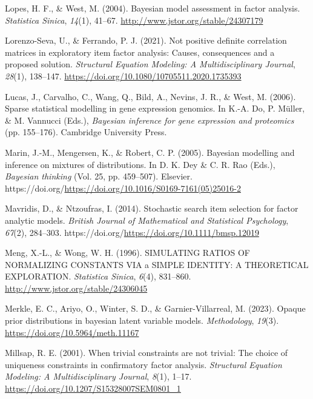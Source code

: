 \documentclass[
  man,
  longtable,
  nolmodern,
  notxfonts,
  notimes,
  colorlinks=true,linkcolor=blue,citecolor=blue,urlcolor=blue]{apa7}
\newlength{\cslhangindent}
\newenvironment{CSLReferences}[2] %
 {\begin{list}{}{%
  \setlength{\itemindent}{0pt}
  \setlength{\leftmargin}{0pt}
  \setlength{\parsep}{0pt}
  \ifodd #1
   \setlength{\leftmargin}{\cslhangindent}
   \setlength{\itemindent}{-1\cslhangindent}
  \fi
  \setlength{\itemsep}{#2\baselineskip}}}
 {\end{list}}
\theoremstyle{plain}
\theoremstyle{plain}
\theoremstyle{remark}
\begin{document}
\begin{CSLReferences}{1}{0}
Lopes, H. F., \& West, M. (2004). Bayesian model assessment in factor
analysis. \emph{Statistica Sinica}, \emph{14}(1), 41--67.
\url{http://www.jstor.org/stable/24307179}

Lorenzo-Seva, U., \& Ferrando, P. J. (2021). Not positive definite
correlation matrices in exploratory item factor analysis: Causes,
consequences and a proposed solution. \emph{Structural Equation
Modeling: A Multidisciplinary Journal}, \emph{28}(1), 138--147.
\url{https://doi.org/10.1080/10705511.2020.1735393}

Lucas, J., Carvalho, C., Wang, Q., Bild, A., Nevins, J. R., \& West, M.
(2006). Sparse statistical modelling in gene expression genomics. In
K.-A. Do, P. Müller, \& M. Vannucci (Eds.), \emph{Bayesian inference for
gene expression and proteomics} (pp. 155--176). Cambridge University
Press.

Marin, J.-M., Mengersen, K., \& Robert, C. P. (2005). Bayesian modelling
and inference on mixtures of distributions. In D. K. Dey \& C. R. Rao
(Eds.), \emph{Bayesian thinking} (Vol. 25, pp. 459--507). Elsevier.
https://doi.org/\url{https://doi.org/10.1016/S0169-7161(05)25016-2}

Mavridis, D., \& Ntzoufras, I. (2014). Stochastic search item selection
for factor analytic models. \emph{British Journal of Mathematical and
Statistical Psychology}, \emph{67}(2), 284--303.
https://doi.org/\url{https://doi.org/10.1111/bmsp.12019}

Meng, X.-L., \& Wong, W. H. (1996). SIMULATING RATIOS OF NORMALIZING
CONSTANTS VIA a SIMPLE IDENTITY: A THEORETICAL EXPLORATION.
\emph{Statistica Sinica}, \emph{6}(4), 831--860.
\url{http://www.jstor.org/stable/24306045}

Merkle, E. C., Ariyo, O., Winter, S. D., \& Garnier-Villarreal, M.
(2023). Opaque prior distributions in bayesian latent variable models.
\emph{Methodology}, \emph{19}(3).
\url{https://doi.org/10.5964/meth.11167}

Millsap, R. E. (2001). When trivial constraints are not trivial: The
choice of uniqueness constraints in confirmatory factor analysis.
\emph{Structural Equation Modeling: A Multidisciplinary Journal},
\emph{8}(1), 1--17. \url{https://doi.org/10.1207/S15328007SEM0801_1}


\end{CSLReferences}
\end{document}
